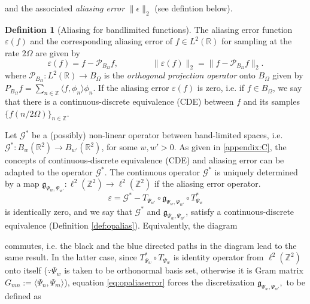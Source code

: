 \documentclass[reqno,10pt]{amsart}
\theoremstyle{plain}
\theoremstyle{definition}
\newtheorem{defn}{Definition}
\newcommand{\bb}[1]{\mathbb{#1}}
\newcommand{\cal}[1]{\mathcal{#1}}
\begin{document}
    and the associated {\it aliasing error} $\|\epsilon\|_2$  (see defintion below).
    \begin{defn}[Aliasing for bandlimited functions]
        The aliasing error function $\varepsilon(f)$ and the corresponding aliasing error of $f \in L^2(\bb R)$ for sampling at the rate $2\Omega$ are given by
        $$ \varepsilon(f) = f - \cal P_{B_\Omega}f, \qquad\qquad \|\varepsilon(f)\|_2 = \|f - \cal P_{B_\Omega}f\|_2.$$
        where $\cal P_{B_\Omega} : L^2(\bb R) \to B_\Omega$ is the {\it orthogonal projection operator} onto $B_\Omega$ given by $P_{B_\Omega}f = \sum_{n\in \bb Z}\langle f,\phi_n\rangle\phi_n$. If the aliasing error $\varepsilon(f)$ is zero, i.e. if $f \in B_\Omega$, we say that there is a continuous-discrete equivalence (CDE) between $f$ and its samples $\{f(n/2\Omega)\}_{n \in \bb Z}$.
    \end{defn}
    \noindent Let $\cal G^*$ be a (possibly) non-linear operator between band-limited spaces, i.e. $\cal G^* :B_w(\bb R^2) \to B_{w'}(\bb R^2)$, for some $w,w' > 0$. As given in \ref{appendix:C}, the concepts of continuous-discrete equivalence (CDE) and aliasing error can be adapted to the operator $\cal G^*$. The continuous operator $\cal G^*$ is uniquely determined by a map $\mathfrak{g}_{\Psi_w, \Psi_{w'}}:\ell^2(\bb Z^2) \to \ell^2(\bb Z^2)$ if the aliasing error operator.
    \begin{equation}\label{eq:opaliaserror}
        \varepsilon = \cal G^* - T_{\Psi_{w'}} \circ \mathfrak{g}_{\Psi_w, \Psi_{w'}} \circ T^*_{\Psi_w}
    \end{equation}
    is identically zero, and we say that $\cal G^*$ and $\mathfrak{g}_{\Psi_w, \Psi_{w'}}$, satisfy a continuous-discrete equivalence (Definition \ref{def:opalias}). Equivalently, the diagram 
    \begin{figure}[!ht]
    \end{figure}
    commutes, i.e. the black and the blue directed paths in the diagram lead to the same result. In the latter case, since $T^*_{\Psi_w} \circ T_{\Psi_w}$ is identity operator from $\ell^2(\bb Z^2)$ onto itself ($\because \Psi_w$ is taken to be orthonormal basis set, otherwise it is Gram matrix $G_{mn} := \langle \Psi_n,\Psi_m\rangle$), equation \ref{eq:opaliaserror} forces the discretization $\mathfrak{g}_{\Psi_w,\Psi_{w'}},$ to be defined as
\end{document}
